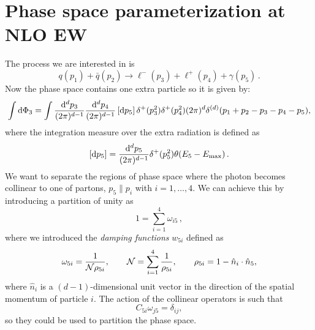 \documentclass[a4paper,11pt]{article}
\begin{document}
\section{Phase space parameterization at NLO EW}
\label{se:NLOEWparam}
The process we are interested in is
\begin{equation}
q(p_1) + \bar{q}(p_2) \to \ell^-(p_3) + \ell^+(p_4) + \gamma(p_5)\, .
\end{equation}
Now the phase space contains one extra particle so it is given by:
\begin{equation}
\int \mathrm d\Phi_{3} = 
\int \frac{\mathrm d^d p_3}{(2\pi)^{d-1}} \frac{\mathrm d^d p_4}{(2\pi)^{d-1}}
\left[\mathrm d p_5\right]
\delta^{+}(p^2_3) \delta^{+}(p^2_4) (2\pi)^d \delta^{(d)}(p_1 + p_2 -p_3-p_4-p_5),
\end{equation}
where the integration measure over the extra radiation is defined as
\begin{equation}
\left[\mathrm d p_5\right] = \frac{\mathrm d^d p_5}{(2\pi)^{d-1}} \delta^{+}(p^2_5) \theta(E_5-E_{\max})\, .
\end{equation}
We want to separate the regions of phase space where the photon becomes collinear 
to one of partons, \ie $p_5 \parallel p_i$ with $i=1,\ldots,4$.
We can achieve this by introducing a partition of unity as
\begin{equation}
1 = \sum_{i=1}^4 \omega_{i5}\, ,
\end{equation}
where we introduced the \textit{damping functions} $w_{5i}$ defined as
\begin{equation}
\omega_{5i} = \frac{1}{\mathcal{N} \rho_{5i}}, \quad\quad
\mathcal{N} = \sum_{i=1}^4 \frac{1}{\rho_{5i}}, \quad\quad
\rho_{5i} = 1 - \hat{n}_i \cdot \hat{n}_5,
\end{equation}
where $\hat{n}_{i}$ is a $(d-1)$-dimensional unit vector in the direction
of the spatial momentum of particle $i$. The action of the collinear operators is such that
\begin{equation}
C_{5i} \omega_{j5} = \delta_{ij},
\end{equation}
so they could be used to partition the phase space.
\end{document}
